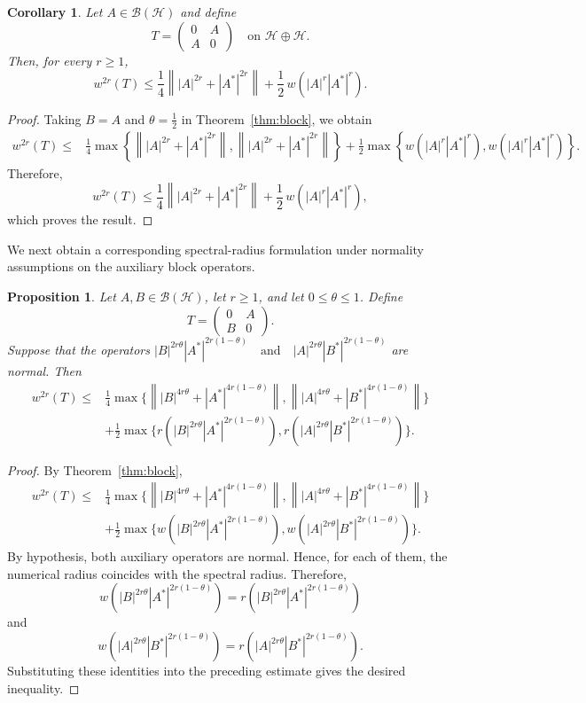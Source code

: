 \documentclass[final,1p,times]{elsarticle}
\newtheorem{prop}[thm]{Proposition}
\newtheorem{cor}[thm]{Corollary}
\newcommand{\BH}{\mathcal{B}(\mathcal{H})}
\newcommand{\norm}[1]{\left\lVert #1 \right\rVert}
\begin{document}
\begin{cor}\label{cor:symmetric}
Let $A\in\BH$ and define
\[
T=
\begin{pmatrix}
0 & A\\
A & 0
\end{pmatrix}
\quad\text{on }\mathcal H\oplus\mathcal H.
\]
Then, for every $r\geq1$,
\[
w^{2r}(T)
\leq
\frac14\norm{|A|^{2r}+|A^*|^{2r}}
+
\frac12\,w\!\left(|A|^r|A^*|^r\right).
\]
\end{cor}

\begin{proof}
Taking $B=A$ and $\theta=\frac12$ in
Theorem~\ref{thm:block}, we obtain
\[
\begin{aligned}
w^{2r}(T)
\leq {}&
\frac14
\max\left\{
\norm{|A|^{2r}+|A^*|^{2r}},
\norm{|A|^{2r}+|A^*|^{2r}}
\right\}+
\frac12
\max\left\{
w\!\left(|A|^r|A^*|^r\right),
w\!\left(|A|^r|A^*|^r\right)
\right\}.
\end{aligned}
\]
Therefore,
\[
w^{2r}(T)
\leq
\frac14\norm{|A|^{2r}+|A^*|^{2r}}
+
\frac12\,w\!\left(|A|^r|A^*|^r\right),
\]
which proves the result.
\end{proof}
\medskip

We next obtain a corresponding spectral-radius formulation under
normality assumptions on the auxiliary block operators.

\begin{prop}\label{thm:block-spectral}
Let $A,B\in\BH$, let $r\geq1$, and let $0\leq\theta\leq1$. Define
\[
T=
\begin{pmatrix}
0 & A\\
B & 0
\end{pmatrix}.
\]
Suppose that the operators $|B|^{2r\theta}|A^*|^{2r(1-\theta)}
\quad\text{and}\quad
|A|^{2r\theta}|B^*|^{2r(1-\theta)}$
are normal. Then
\[
\begin{aligned}
w^{2r}(T)
\leq {}&
\frac14
\max\Big\{
\norm{|B|^{4r\theta}+|A^*|^{4r(1-\theta)}},
\norm{|A|^{4r\theta}+|B^*|^{4r(1-\theta)}}
\Big\}
\\
&+
\frac12
\max\Big\{
r\!\left(|B|^{2r\theta}|A^*|^{2r(1-\theta)}\right),
r\!\left(|A|^{2r\theta}|B^*|^{2r(1-\theta)}\right)
\Big\}.
\end{aligned}
\]
\end{prop}

\begin{proof}
By Theorem~\ref{thm:block},
\[
\begin{aligned}
w^{2r}(T)
\leq {}&
\frac14
\max\Big\{
\norm{|B|^{4r\theta}+|A^*|^{4r(1-\theta)}},
\norm{|A|^{4r\theta}+|B^*|^{4r(1-\theta)}}
\Big\}
\\
&+
\frac12
\max\Big\{
w\!\left(|B|^{2r\theta}|A^*|^{2r(1-\theta)}\right),
w\!\left(|A|^{2r\theta}|B^*|^{2r(1-\theta)}\right)
\Big\}.
\end{aligned}
\]
By hypothesis, both auxiliary operators are normal. Hence, for each of them,
the numerical radius coincides with the spectral radius. Therefore,
\[
w\!\left(|B|^{2r\theta}|A^*|^{2r(1-\theta)}\right)
=
r\!\left(|B|^{2r\theta}|A^*|^{2r(1-\theta)}\right)
\]
and
\[
w\!\left(|A|^{2r\theta}|B^*|^{2r(1-\theta)}\right)
=
r\!\left(|A|^{2r\theta}|B^*|^{2r(1-\theta)}\right).
\]
Substituting these identities into the preceding estimate gives the desired
inequality.
\end{proof}
\end{document}
